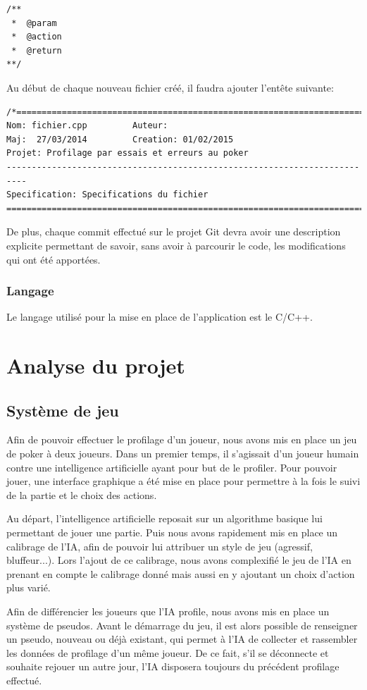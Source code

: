 \documentclass{report}
\begin{document}
\begin{lstlisting}
/**
 *  @param
 *  @action
 *  @return
**/
\end{lstlisting}

Au début de chaque nouveau fichier créé, il faudra ajouter l'entête suivante: 
\begin{lstlisting}
/*========================================================================
Nom: fichier.cpp         Auteur: 
Maj:  27/03/2014         Creation: 01/02/2015
Projet: Profilage par essais et erreurs au poker
--------------------------------------------------------------------------
Specification: Specifications du fichier
=========================================================================*/
\end{lstlisting}

De plus, chaque commit effectué sur le projet Git devra avoir une description explicite permettant de savoir, sans avoir à parcourir le code, les modifications qui ont été apportées.\par

\subsection{Langage}
\hspace{0.5cm}Le langage utilisé pour la mise en place de l'application est le C/C++.

\chapter{Analyse du projet}

\section{Système de jeu}

\hspace{0.5cm}Afin de pouvoir effectuer le profilage d'un joueur, nous avons mis en place un jeu de poker à deux joueurs. Dans un premier temps, il s'agissait d'un joueur humain contre une intelligence artificielle ayant pour but de le profiler. Pour pouvoir jouer, une interface graphique a été mise en place pour permettre à la fois le suivi de la partie et le choix des actions.\par
Au départ, l'intelligence artificielle reposait sur un algorithme basique lui permettant de jouer une partie. Puis nous avons rapidement mis en place un calibrage de l'IA, afin de pouvoir lui attribuer un style de jeu (agressif, bluffeur...). Lors l'ajout de ce calibrage, nous avons complexifié le jeu de l'IA en prenant en compte le calibrage donné mais aussi en y ajoutant un choix d'action plus varié.\par
Afin de différencier les joueurs que l'IA profile, nous avons mis en place un système de pseudos. Avant le démarrage du jeu, il est alors possible de renseigner un pseudo, nouveau ou déjà existant, qui permet à l'IA de collecter et rassembler les données de profilage d'un même joueur. De ce fait, s'il se déconnecte et souhaite rejouer un autre jour, l'IA disposera toujours du précédent profilage effectué.\\
\end{document}
